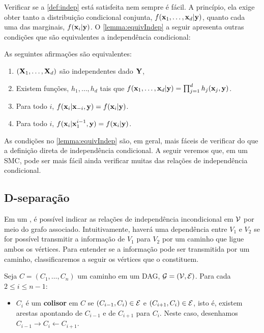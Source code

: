 Verificar se a \cref{def:indep} está satisfeita nem sempre é fácil.
A princípio, ela exige obter tanto a distribuição condicional conjunta, 
$f({\mathbf{x}}_1,\ldots,{\mathbf{x}}_d|{\mathbf{y}})$, quanto cada uma das marginais, $f({\mathbf{x}}_i|{\mathbf{y}})$.
O \cref{lemma:equivIndep} a seguir apresenta outras condições que
são equivalentes a independência condicional:

\begin{lemma}
 \label{lemma:equivIndep}
 As seguintes afirmações são equivalentes:
 \begin{enumerate}
  \item $({\mathbf{X}}_1,\ldots,{\mathbf{X}}_d)$ são independentes dado ${\mathbf{Y}}$,
  \item Existem funções, $h_1,\ldots,h_d$ tais que
  $f({\mathbf{x}}_1,\ldots,{\mathbf{x}}_d|{\mathbf{y}}) = \prod_{j=1}^{d}{h_j({\mathbf{x}}_j,{\mathbf{y}})}$.	
	\item Para todo $i$, 
	$f({\mathbf{x}}_i|{\mathbf{x}}_{-i},{\mathbf{y}}) = f({\mathbf{x}}_i|{\mathbf{y}})$.
	\item Para todo $i$,
	$f({\mathbf{x}}_i|{\mathbf{x}}_1^{i-1},{\mathbf{y}}) = f({\mathbf{x}}_i|{\mathbf{y}})$.
 \end{enumerate}
\end{lemma}

As condições no \cref{lemma:equivIndep} são, em geral,
mais fáceis de verificar do que 
a definição direta de independência condicional.
A seguir veremos que, em um SMC, pode
ser mais fácil ainda verificar
muitas das relações de independência condicional.

\subsection{D-separação}

Em um \CM, é possível indicar 
as relações de independência incondicional em ${\mathcal V}$
por meio do grafo associado.
Intuitivamente, haverá uma dependência
entre $V_1$ e $V_2$ se for possível
transmitir a informação de $V_1$ para $V_2$
por um caminho que ligue ambos os vértices.
Para entender se a informação 
pode ser transmitida por um caminho,
classificaremos a seguir os vértices que o constituem.

\begin{definition}
 \label{def:caminho-cat}
 Seja $C = (C_1,\ldots,C_n)$ um caminho 
 em um DAG, ${\mathcal G} = ({\mathcal V},{\mathcal E})$.
 Para cada $2 \leq i \leq n-1$:
 \begin{itemize}
  \item $C_i$ é um \textbf{colisor} em $C$ se
  $(C_{i-1},C_{i}) \in {\mathcal E}$ e $(C_{i+1},C_{i}) \in {\mathcal E}$,
  isto é, existem arestas apontando de $C_{i-1}$ e de $C_{i+1}$ 
  para $C_{i}$. Neste caso, desenhamos
  $C_{i-1} \rightarrow C_i \leftarrow C_{i+1}$.
 \end{itemize}
\end{definition}

